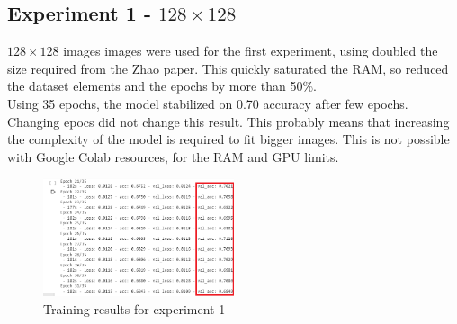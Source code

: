 \documentclass[twocolumn,showpacs,%
  nofootinbib,aps,superscriptaddress,%
  eqsecnum,prd,notitlepage,showkeys,10pt]{revtex4-1}
\begin{document}
\subsection{Experiment 1 - $128\times128$}\label{subs:ex1}
$128\times128$ images images were used for the first experiment, using doubled the size required from the Zhao paper. This quickly saturated the RAM, so reduced the dataset elements and the epochs by more than 50\%.\\
Using 35 epochs, the model stabilized on 0.70 accuracy after few epochs. Changing epocs did not change this result. This probably means that increasing the complexity of the model is required to fit bigger images. This is not possible with Google Colab resources, for the RAM and GPU limits.\\
\begin{figure}[H]
\includegraphics[width=0.5\textwidth]{images/128x128_35epoch_10batch_fit.png}
\caption{\label{fig:your-figure}Training results for experiment 1}
\end{figure}
\end{document}
